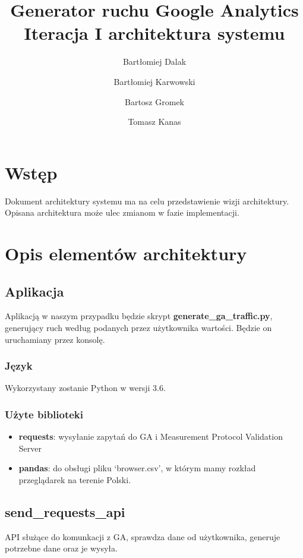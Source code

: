 \documentclass{article}
\title{Generator ruchu Google Analytics \\ Iteracja I architektura systemu}
\author{Bartłomiej Dalak \and Bartłomiej Karwowski \and Bartosz Gromek \and Tomasz Kanas}
\begin{document}
\maketitle

\section{Wstęp}

Dokument architektury systemu ma na celu przedstawienie wizji architektury. Opisana architektura może ulec zmianom w fazie implementacji.

\section{Opis elementów architektury}

\subsection{Aplikacja}

Aplikacją w naszym przypadku będzie skrypt \textbf{generate\_ga\_traffic.py}, generujący ruch według podanych przez użytkownika wartości. Będzie on uruchamiany przez konsolę.

\subsubsection{Język}

Wykorzystany zostanie Python w wersji 3.6.

\subsubsection{Użyte biblioteki}

\begin{itemize}
\item \textbf{requests}: wysyłanie zapytań do GA i Measurement Protocol Validation Server
\item \textbf{pandas}: do obsługi pliku `browser.csv', w którym mamy rozkład przeglądarek na terenie Polski.
\end{itemize}

\subsection{send\_requests\_api}
API służące do komunkacji z GA, sprawdza dane od użytkownika, generuje potrzebne dane oraz je wysyła.
\end{document}
